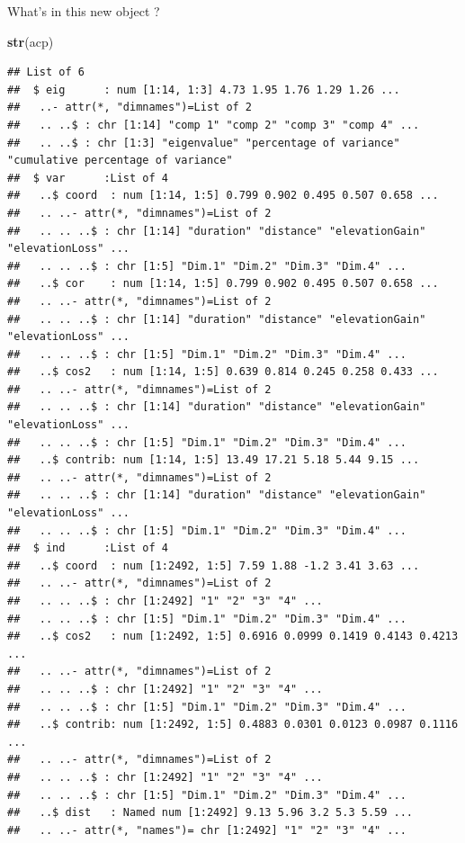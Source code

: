 \documentclass[
]{book}
\newenvironment{Shaded}{\begin{snugshade}}{\end{snugshade}}
\newcommand{\KeywordTok}[1]{\textcolor[rgb]{0.13,0.29,0.53}{\textbf{#1}}}
\newcommand{\NormalTok}[1]{#1}
\begin{document}
What's in this new object ?

\begin{Shaded}
\begin{Highlighting}[]
\KeywordTok{str}\NormalTok{(acp)}
\end{Highlighting}
\end{Shaded}

\begin{verbatim}
## List of 6
##  $ eig      : num [1:14, 1:3] 4.73 1.95 1.76 1.29 1.26 ...
##   ..- attr(*, "dimnames")=List of 2
##   .. ..$ : chr [1:14] "comp 1" "comp 2" "comp 3" "comp 4" ...
##   .. ..$ : chr [1:3] "eigenvalue" "percentage of variance" "cumulative percentage of variance"
##  $ var      :List of 4
##   ..$ coord  : num [1:14, 1:5] 0.799 0.902 0.495 0.507 0.658 ...
##   .. ..- attr(*, "dimnames")=List of 2
##   .. .. ..$ : chr [1:14] "duration" "distance" "elevationGain" "elevationLoss" ...
##   .. .. ..$ : chr [1:5] "Dim.1" "Dim.2" "Dim.3" "Dim.4" ...
##   ..$ cor    : num [1:14, 1:5] 0.799 0.902 0.495 0.507 0.658 ...
##   .. ..- attr(*, "dimnames")=List of 2
##   .. .. ..$ : chr [1:14] "duration" "distance" "elevationGain" "elevationLoss" ...
##   .. .. ..$ : chr [1:5] "Dim.1" "Dim.2" "Dim.3" "Dim.4" ...
##   ..$ cos2   : num [1:14, 1:5] 0.639 0.814 0.245 0.258 0.433 ...
##   .. ..- attr(*, "dimnames")=List of 2
##   .. .. ..$ : chr [1:14] "duration" "distance" "elevationGain" "elevationLoss" ...
##   .. .. ..$ : chr [1:5] "Dim.1" "Dim.2" "Dim.3" "Dim.4" ...
##   ..$ contrib: num [1:14, 1:5] 13.49 17.21 5.18 5.44 9.15 ...
##   .. ..- attr(*, "dimnames")=List of 2
##   .. .. ..$ : chr [1:14] "duration" "distance" "elevationGain" "elevationLoss" ...
##   .. .. ..$ : chr [1:5] "Dim.1" "Dim.2" "Dim.3" "Dim.4" ...
##  $ ind      :List of 4
##   ..$ coord  : num [1:2492, 1:5] 7.59 1.88 -1.2 3.41 3.63 ...
##   .. ..- attr(*, "dimnames")=List of 2
##   .. .. ..$ : chr [1:2492] "1" "2" "3" "4" ...
##   .. .. ..$ : chr [1:5] "Dim.1" "Dim.2" "Dim.3" "Dim.4" ...
##   ..$ cos2   : num [1:2492, 1:5] 0.6916 0.0999 0.1419 0.4143 0.4213 ...
##   .. ..- attr(*, "dimnames")=List of 2
##   .. .. ..$ : chr [1:2492] "1" "2" "3" "4" ...
##   .. .. ..$ : chr [1:5] "Dim.1" "Dim.2" "Dim.3" "Dim.4" ...
##   ..$ contrib: num [1:2492, 1:5] 0.4883 0.0301 0.0123 0.0987 0.1116 ...
##   .. ..- attr(*, "dimnames")=List of 2
##   .. .. ..$ : chr [1:2492] "1" "2" "3" "4" ...
##   .. .. ..$ : chr [1:5] "Dim.1" "Dim.2" "Dim.3" "Dim.4" ...
##   ..$ dist   : Named num [1:2492] 9.13 5.96 3.2 5.3 5.59 ...
##   .. ..- attr(*, "names")= chr [1:2492] "1" "2" "3" "4" ...

\end{verbatim}
\end{document}
